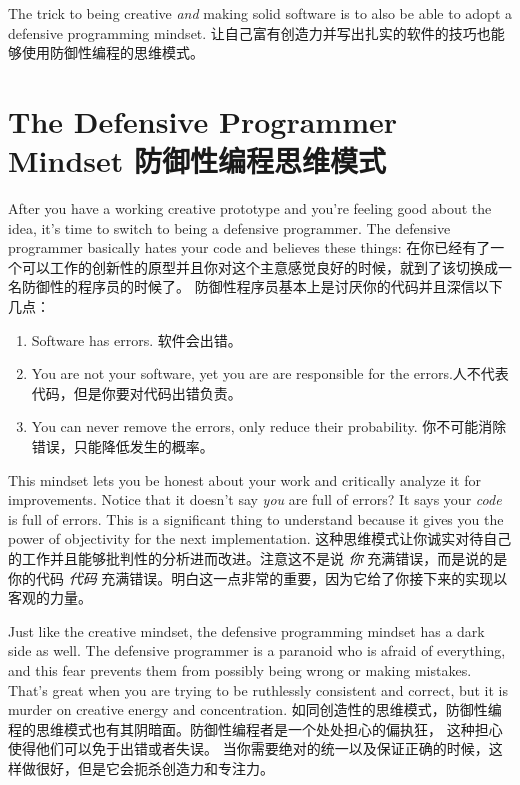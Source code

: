 The trick to being creative \emph{and} making solid software is to 
also be able to adopt a defensive programming mindset.
让自己富有创造力并写出扎实的软件的技巧也能够使用防御性编程的思维模式。

\section{The Defensive Programmer Mindset 防御性编程思维模式}

After you have a working creative prototype and you're feeling good about the
idea, it's time to switch to being a defensive programmer.  The defensive
programmer basically hates your code and believes these things:
在你已经有了一个可以工作的创新性的原型并且你对这个主意感觉良好的时候，就到了该切换成一名防御性的程序员的时候了。
防御性程序员基本上是讨厌你的代码并且深信以下几点：

\begin{enumerate}
\item Software has errors. 软件会出错。
\item You are not your software, yet you are are responsible for the errors.人不代表代码，但是你要对代码出错负责。
\item You can never remove the errors, only reduce their probability. 你不可能消除错误，只能降低发生的概率。
\end{enumerate}

This mindset lets you be honest about your work and critically analyze it 
for improvements.  Notice that it doesn't say \emph{you} are full of errors?
It says your \emph{code} is full of errors.  This is a significant thing to
understand because it gives you the power of objectivity for the next
implementation.
这种思维模式让你诚实对待自己的工作并且能够批判性的分析进而改进。注意这不是说 \emph{你} 充满错误，而是说的是你的代码  \emph{代码} 充满错误。明白这一点非常的重要，因为它给了你接下来的实现以客观的力量。 

Just like the creative mindset, the defensive programming mindset has a
dark side as well.  The defensive programmer is a paranoid who is afraid
of everything, and this fear prevents them from possibly being wrong or
making mistakes.  That's great when you are trying to be ruthlessly
consistent and correct, but it is murder on creative energy and 
concentration.
如同创造性的思维模式，防御性编程的思维模式也有其阴暗面。防御性编程者是一个处处担心的偏执狂， 这种担心使得他们可以免于出错或者失误。 当你需要绝对的统一以及保证正确的时候，这样做很好，但是它会扼杀创造力和专注力。


